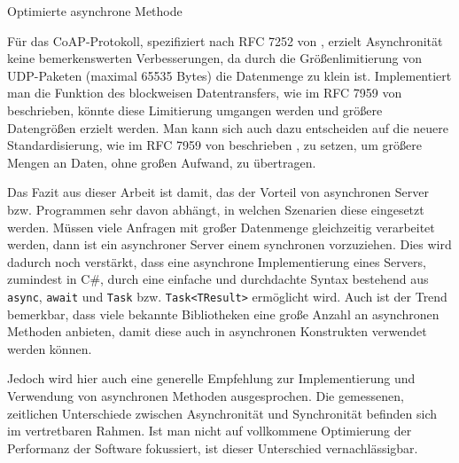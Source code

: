 \begin{listing}[h]
    \inputminted[framesep=2mm, baselinestretch=1.2, fontsize=\normalsize, linenos]{csharp}{codes/example_async_method.cs}
    \caption{Optimierte asynchrone Methode}
    \label{listing:optimierte-asynchrone-methode}
\end{listing}

Für das CoAP-Protokoll, spezifiziert nach RFC 7252 von \citeauthor{RFC7252} \cite{RFC7252}, erzielt Asynchronität keine bemerkenswerten Verbesserungen, da durch die Größenlimitierung von UDP-Paketen (maximal 65535 Bytes) die Datenmenge zu klein ist. Implementiert man die Funktion des blockweisen Datentransfers, wie im RFC 7959 von \citeauthor{RFC7959}  \cite{RFC7959} beschrieben, könnte diese Limitierung umgangen werden und größere Datengrößen erzielt werden. Man kann sich auch dazu entscheiden auf die neuere Standardisierung, wie im RFC 7959 von \citeauthor{RFC7959} beschrieben \cite{RFC7959}, zu setzen, um größere Mengen an Daten, ohne großen Aufwand, zu übertragen.

Das Fazit aus dieser Arbeit ist damit, das der Vorteil von asynchronen Server bzw. Programmen sehr davon abhängt, in welchen Szenarien diese eingesetzt werden. Müssen viele Anfragen mit großer Datenmenge gleichzeitig verarbeitet werden, dann ist ein asynchroner Server einem synchronen vorzuziehen. Dies wird dadurch noch verstärkt, dass eine asynchrone Implementierung eines Servers, zumindest in C\#, durch eine einfache und durchdachte Syntax bestehend aus \texttt{async}, \texttt{await} und \texttt{Task} bzw. \texttt{Task<TResult>} ermöglicht wird. Auch ist der Trend bemerkbar, dass viele bekannte Bibliotheken eine große Anzahl an asynchronen Methoden anbieten, damit diese auch in asynchronen Konstrukten verwendet werden können.

Jedoch wird hier auch eine generelle Empfehlung zur Implementierung und Verwendung von asynchronen Methoden ausgesprochen. Die gemessenen, zeitlichen Unterschiede zwischen Asynchronität und Synchronität befinden sich im vertretbaren Rahmen. Ist man nicht auf vollkommene Optimierung der Performanz der Software fokussiert, ist dieser Unterschied vernachlässigbar.
